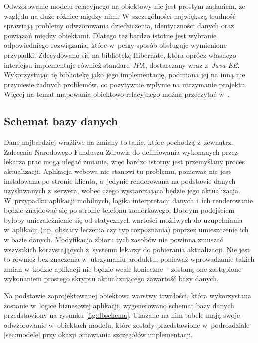 \documentclass[11pt]{aghdpl}
\begin{document}
Odwzorowanie modelu relacyjnego na obiektowy nie jest prostym zadaniem, ze względu na duże różnice między nimi. W~szczególności największą trudność sprawiają problemy odwzorowania dziedziczenia, identyczności danych oraz powiązań między obiektami. Dlatego też bardzo istotne jest wybranie odpowiedniego rozwiązania, które w~pełny sposób obsługuje wymienione przypadki. Zdecydowano się na bibliotekę Hibernate, która oprócz własnego interfejsu implementuje również standard \emph{JPA}, dostarczany wraz z~\emph{Java EE}. Wykorzystując tę bibliotekę jako jego implementację, podmiana jej na inną nie przyniesie żadnych problemów, co pozytywnie wpłynie na utrzymanie projektu. Więcej na temat mapowania obiektowo-relacyjnego można przeczytać w~\cite{HORM}.

\subsection{Schemat bazy danych}

Dane najbardziej wrażliwe na zmiany to takie, które pochodzą z~zewnątrz. Zalecenia Narodowego Funduszu Zdrowia do definiowania wykonanych przez lekarza prac mogą ulegać zmianie, więc bardzo istotny jest przemyślany proces aktualizacji. Aplikacja webowa nie stanowi tu problemu, ponieważ nie jest instalowana po stronie klienta, a~jedynie renderowana na podstawie danych uzyskiwanych z~serwera, wobec czego wystarczająca będzie jego aktualizacja. W~przypadku aplikacji mobilnych, logika interpretacji danych i~ich renderowanie będzie znajdować się po stronie telefonu komórkowego. Dobrym podejściem byłoby uniezależnienie się od statycznych wartości możliwych do uzupełniania w~aplikacji (np. obszary leczenia czy typ rozpoznania) poprzez umieszczenie ich w bazie danych. Modyfikacja zbioru tych zasobów nie powinna zmuszać wszystkich korzystających z~systemu lekarzy do pobierania aktualizacji. Nie jest to również bez znaczenia w~utrzymaniu produktu, ponieważ wprowadzanie takich zmian w~kodzie aplikacji nie będzie wcale konieczne -- zostaną one zastąpione wykonaniem prostego skryptu aktualizującego zawartość bazy danych.

Na podstawie zaprojektowanej obiektowo warstwy trwałości, która wykorzystana zostanie w~logice biznesowej aplikacji, wygenerowano schemat bazy danych przedstawiony na rysunku \ref{fig:dbschema}. Ukazane na nim tabele mają swoje odwzorowanie w~obiektach modelu, które zostały przedstawione w~podrozdziale \ref{sec:modele} przy okazji omawiania szczegółów implementacji.
\end{document}
